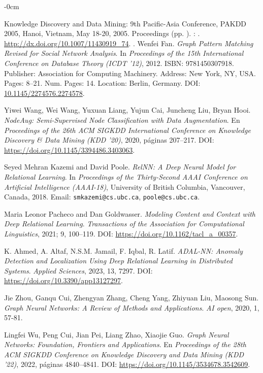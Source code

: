 \documentclass[mathematics,article,submit,pdftex,moreauthors]{Definitions/mdpi}
\begin{document}
\begin{adjustwidth}{-\extralength}{0cm}
\begin{thebibliography}{31}
{{{  Knowledge Discovery and Data Mining: 9th Pacific-Asia Conference, PAKDD 2005,
  Hanoi, Vietnam, May 18-20, 2005. Proceedings}\/} (pp.
  ).
\newblock {}: .
\newblock \URLprefix \url{http://dx.doi.org/10.1007/11430919_74}.
  \DOIprefix{}.
Wenfei Fan.
\emph{Graph Pattern Matching Revised for Social Network Analysis}.
In \emph{Proceedings of the 15th International Conference on Database Theory (ICDT '12)}, 2012.
ISBN: 9781450307918.
Publisher: Association for Computing Machinery.
Address: New York, NY, USA.
Pages: 8--21.
Num. Pages: 14.
Location: Berlin, Germany.
DOI: \href{https://doi.org/10.1145/2274576.2274578}{10.1145/2274576.2274578}.

Yiwei Wang, Wei Wang, Yuxuan Liang, Yujun Cai, Juncheng Liu, Bryan Hooi.
\emph{NodeAug: Semi-Supervised Node Classification with Data Augmentation}.
En \emph{Proceedings of the 26th ACM SIGKDD International Conference on Knowledge Discovery \& Data Mining (KDD '20)}, 2020, páginas 207–217.
DOI: \url{https://doi.org/10.1145/3394486.3403063}.


Seyed Mehran Kazemi and David Poole.
\emph{RelNN: A Deep Neural Model for Relational Learning}.
In \emph{Proceedings of the Thirty-Second AAAI Conference on Artificial Intelligence (AAAI-18)}, University of British Columbia, Vancouver, Canada, 2018.
Email: \texttt{smkazemi@cs.ubc.ca}, \texttt{poole@cs.ubc.ca}.

Maria Leonor Pacheco and Dan Goldwasser.
\emph{Modeling Content and Context with Deep Relational Learning}.
\emph{Transactions of the Association for Computational Linguistics}, 2021; 9, 100–119.
DOI: \url{https://doi.org/10.1162/tacl_a_00357}.

K. Ahmed, A. Altaf, N.S.M. Jamail, F. Iqbal, R. Latif.
\emph{ADAL-NN: Anomaly Detection and Localization Using Deep Relational Learning in Distributed Systems}.
\emph{Applied Sciences}, 2023, 13, 7297.
DOI: \url{https://doi.org/10.3390/app13127297}.

Jie Zhou, Ganqu Cui, Zhengyan Zhang, Cheng Yang, Zhiyuan Liu, Maosong Sun.
\emph{Graph Neural Networks: A Review of Methods and Applications}.
\emph{AI open}, 2020, 1, 57-81.

Lingfei Wu, Peng Cui, Jian Pei, Liang Zhao, Xiaojie Guo.
\emph{Graph Neural Networks: Foundation, Frontiers and Applications}.
En \emph{Proceedings of the 28th ACM SIGKDD Conference on Knowledge Discovery and Data Mining (KDD '22)}, 2022, páginas 4840–4841.
DOI: \url{https://doi.org/10.1145/3534678.3542609}.

}
\end{thebibliography}
\end{adjustwidth}
\end{document}
